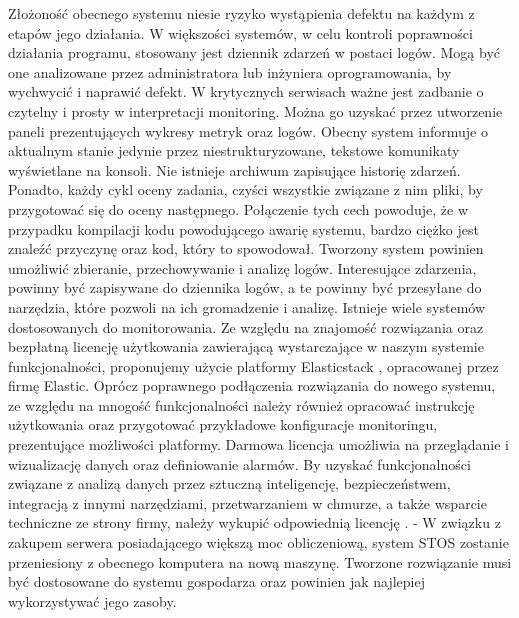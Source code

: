 \newline \indent Złożoność obecnego systemu niesie ryzyko wystąpienia defektu na każdym z etapów jego działania. W większości systemów, w celu kontroli poprawności działania programu, stosowany jest dziennik zdarzeń w postaci logów. Mogą być one analizowane przez administratora lub inżyniera oprogramowania, by wychwycić i naprawić defekt. W krytycznych serwisach ważne jest zadbanie o czytelny i prosty w interpretacji monitoring. Można go uzyskać przez utworzenie paneli prezentujących wykresy metryk oraz logów. Obecny system informuje o aktualnym stanie jedynie przez niestrukturyzowane, tekstowe komunikaty wyświetlane na konsoli. Nie istnieje archiwum zapisujące historię zdarzeń. Ponadto, każdy cykl oceny zadania, czyści wszystkie związane z nim pliki, by przygotować się do oceny następnego. Połączenie tych cech powoduje, że w przypadku kompilacji kodu powodującego awarię systemu, bardzo ciężko jest znaleźć przyczynę oraz kod, który to spowodował. Tworzony system powinien umożliwić zbieranie, przechowywanie i analizę logów. Interesujące zdarzenia, powinny być zapisywane do dziennika logów, a te powinny być przesyłane do narzędzia, które pozwoli na ich gromadzenie i analizę. Istnieje wiele systemów dostosowanych do monitorowania. Ze względu na znajomość rozwiązania oraz bezpłatną licencję użytkowania zawierającą wystarczające w naszym systemie funkcjonalności, proponujemy użycie platformy Elasticstack \cite{elastic}, opracowanej przez firmę Elastic. Oprócz poprawnego podłączenia rozwiązania do nowego systemu, ze względu na mnogość funkcjonalności należy również opracować instrukcję użytkowania oraz przygotować przykładowe konfiguracje monitoringu, prezentujące możliwości platformy. Darmowa licencja umożliwia na przeglądanie i wizualizację danych oraz definiowanie alarmów. By uzyskać funkcjonalności związane z analizą danych przez sztuczną inteligencję, bezpieczeństwem, integracją z innymi narzędziami, przetwarzaniem w chmurze, a także wsparcie techniczne ze strony firmy, należy wykupić odpowiednią licencję \cite{elasticLicencje}.
\newline \indent- W związku z zakupem serwera posiadającego większą moc obliczeniową, system STOS zostanie przeniesiony z obecnego komputera na nową maszynę. Tworzone rozwiązanie musi być dostosowane do systemu gospodarza oraz powinien jak najlepiej wykorzystywać jego zasoby.
